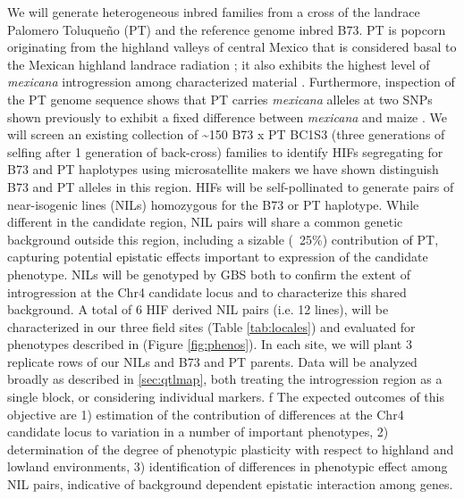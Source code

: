 We will generate heterogeneous inbred families \citep[HIFs;][]{tuinstra1997heterogeneous} from a cross of the landrace Palomero Toluque\~no (PT) and the reference genome inbred B73.  PT is popcorn originating from the highland valleys of central Mexico that is considered basal to the Mexican highland landrace radiation \citep{reif2006grouping}; it also exhibits the highest level of \emph{mexicana} introgression among characterized material \citep{Matsuoka2002}. Furthermore, inspection of the PT genome sequence \citep{Vielle-Calzada2009} shows that PT carries \emph{mexicana} alleles at two SNPs shown previously to exhibit a fixed difference between  \emph{mexicana} and maize \citep{Hufford2013}. We will screen an existing collection of \textasciitilde 150 B73 x PT BC1S3 (three generations of selfing after 1 generation of back-cross) families to identify HIFs segregating for B73 and PT haplotypes using microsatellite makers we have shown distinguish B73 and PT alleles in this region. HIFs will be self-pollinated to generate pairs of near-isogenic lines (NILs) homozygous for the B73 or PT haplotype. While different in the candidate region, NIL pairs will share a common genetic background outside this region, including a sizable (~25\%) contribution of PT, capturing potential epistatic effects important to expression of the candidate phenotype. NILs will be genotyped by GBS  \citep{Elshire 2011, Glaubitz2014} both to confirm the extent of introgression at the Chr4 candidate locus and to characterize this shared background. A total of 6 HIF derived NIL pairs (i.e. 12 lines), will be characterized in our three field sites (Table \ref{tab:locales}) and evaluated for phenotypes described in (Figure \ref{fig:phenos}). In each site, we will plant 3 replicate rows of our NILs and B73 and PT parents. Data will be analyzed broadly as described in \ref{sec:qtlmap}, both treating the introgression region as a single block, or considering individual markers.
f
The expected outcomes of this objective are 1) estimation of the contribution of differences at the Chr4 candidate locus to variation in a number of important phenotypes, 2) determination of the degree of phenotypic plasticity with respect to highland and lowland environments, 3) identification of differences in phenotypic effect among NIL pairs, indicative of background dependent epistatic interaction among genes.

